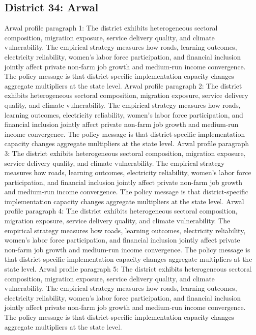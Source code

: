 \documentclass[preprint,12pt]{elsarticle}
\begin{document}
\subsection{District 34: Arwal}
Arwal profile paragraph 1: The district exhibits heterogeneous sectoral composition, migration exposure, service delivery quality, and climate vulnerability. The empirical strategy measures how roads, learning outcomes, electricity reliability, women's labor force participation, and financial inclusion jointly affect private non-farm job growth and medium-run income convergence. The policy message is that district-specific implementation capacity changes aggregate multipliers at the state level.
Arwal profile paragraph 2: The district exhibits heterogeneous sectoral composition, migration exposure, service delivery quality, and climate vulnerability. The empirical strategy measures how roads, learning outcomes, electricity reliability, women's labor force participation, and financial inclusion jointly affect private non-farm job growth and medium-run income convergence. The policy message is that district-specific implementation capacity changes aggregate multipliers at the state level.
Arwal profile paragraph 3: The district exhibits heterogeneous sectoral composition, migration exposure, service delivery quality, and climate vulnerability. The empirical strategy measures how roads, learning outcomes, electricity reliability, women's labor force participation, and financial inclusion jointly affect private non-farm job growth and medium-run income convergence. The policy message is that district-specific implementation capacity changes aggregate multipliers at the state level.
Arwal profile paragraph 4: The district exhibits heterogeneous sectoral composition, migration exposure, service delivery quality, and climate vulnerability. The empirical strategy measures how roads, learning outcomes, electricity reliability, women's labor force participation, and financial inclusion jointly affect private non-farm job growth and medium-run income convergence. The policy message is that district-specific implementation capacity changes aggregate multipliers at the state level.
Arwal profile paragraph 5: The district exhibits heterogeneous sectoral composition, migration exposure, service delivery quality, and climate vulnerability. The empirical strategy measures how roads, learning outcomes, electricity reliability, women's labor force participation, and financial inclusion jointly affect private non-farm job growth and medium-run income convergence. The policy message is that district-specific implementation capacity changes aggregate multipliers at the state level.
\end{document}

